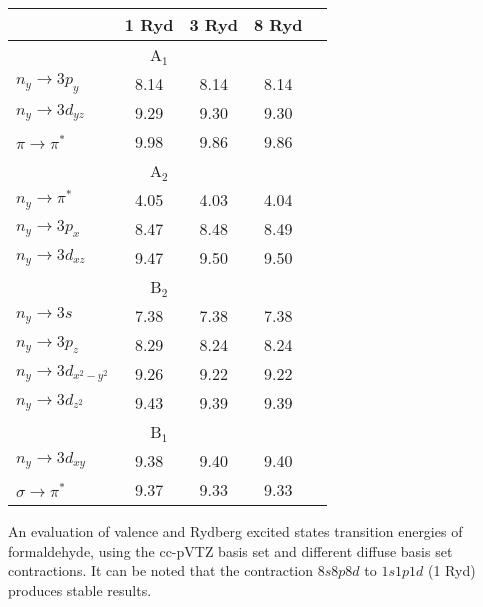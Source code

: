 \begin{center}
\begin{threeparttable}
\footnotesize
\begin{tabular*}{0.70\textwidth}{l@{\hspace{30mm}}cccc}
\hline
                       &  1 Ryd        &  3 Ryd        &  8 Ryd         \\
\hline
                        \multicolumn{4}{c}{\small A$_1$} 	\\
$n_y\!\!\rightarrow\!\! 3p_y$       &   8.14       & 8.14          &  8.14  \\
$n_y\!\!\rightarrow\!\! 3d_{yz}$    &   9.29       & 9.30          &  9.30 \\
$\pi\!\!\rightarrow\!\!\pi^{*}$     &   9.98       & 9.86          &  9.86 \\
                        \multicolumn{4}{c}{\small A$_2$} 	\\
$n_y\!\!\rightarrow\!\!\pi^*$       &   4.05       & 4.03          &  4.04 \\
$n_y\!\!\rightarrow\!\! 3p_x$       &   8.47       & 8.48          &  8.49 \\
$n_y\!\!\rightarrow\!\! 3d_{xz}$    &   9.47       & 9.50          &  9.50 \\
                        \multicolumn{4}{c}{\small B$_2$} 	\\
$n_y\!\!\rightarrow\!\! 3s$               &   7.38       & 7.38          &  7.38 \\
$n_y\!\!\rightarrow\!\! 3p_z$             &   8.29       & 8.24          &  8.24 \\
$n_y\!\!\rightarrow\!\! 3d_{x^2\!-\!y^2}$ &   9.26       & 9.22          &  9.22 \\
$n_y\!\!\rightarrow\!\! 3d_{z^2}$         &   9.43       & 9.39          &  9.39 \\
                        \multicolumn{4}{c}{\small B$_1$} 	\\
$n_y\!\!\rightarrow\!\! 3d_{xy}$          &   9.38       & 9.40          &  9.40 \\
$\sigma\!\!\rightarrow\!\!\pi^{*}$           &   9.37       & 9.33          &  9.33 \\
\hline
\end{tabular*}
\caption{\footnotesize An evaluation of valence and Rydberg excited states transition
energies of formaldehyde, using the cc-pVTZ basis set and different diffuse
basis set contractions. It can be noted that the contraction $8s8p8d$ to
$1s1p1d$ (1 Ryd) produces stable results.\label{tbl:rydberg_contraction}}
\end{threeparttable}
\end{center}
